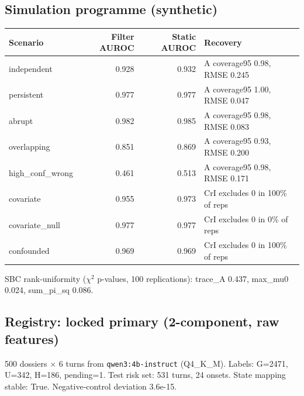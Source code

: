 \subsection{Simulation programme (synthetic)}
\begin{center}\small\begin{tabular}{lrrl}\toprule Scenario & Filter AUROC & Static AUROC & Recovery\\\midrule
independent & 0.928 & 0.932 & A coverage95 0.98, RMSE 0.245\\
persistent & 0.977 & 0.977 & A coverage95 1.00, RMSE 0.047\\
abrupt & 0.982 & 0.985 & A coverage95 0.98, RMSE 0.083\\
overlapping & 0.851 & 0.869 & A coverage95 0.93, RMSE 0.200\\
high\_conf\_wrong & 0.461 & 0.513 & A coverage95 0.98, RMSE 0.171\\
covariate & 0.955 & 0.973 & CrI excludes 0 in 100\% of reps\\
covariate\_null & 0.977 & 0.977 & CrI excludes 0 in 0\% of reps\\
confounded & 0.969 & 0.969 & CrI excludes 0 in 100\% of reps\\\bottomrule\end{tabular}\end{center}SBC rank-uniformity ($\chi^2$ p-values, 100 replications): trace\_A 0.437, max\_mu0 0.024, sum\_pi\_sq 0.086.

\subsection{Registry: locked primary (2-component, raw features)}

500 dossiers $\times$ 6 turns from \texttt{qwen3:4b-instruct} (Q4\_K\_M). Labels: G=2471, U=342, H=186, pending=1. Test risk set: 531 turns, 24 onsets. State mapping stable: True. Negative-control deviation 3.6e-15.


